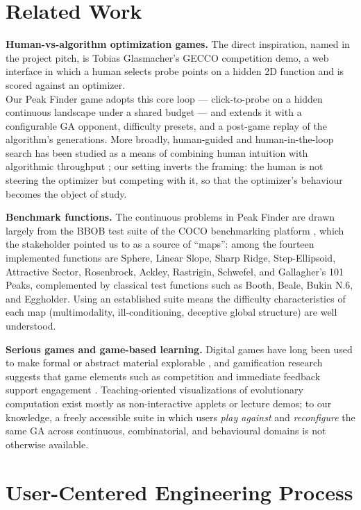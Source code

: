 \documentclass[conference]{IEEEtran}
\begin{document}
\section{Related Work}
\textbf{Human-vs-algorithm optimization games.} The direct inspiration, named in the project pitch, is Tobias Glasmacher's GECCO competition demo, a web interface in which a human selects probe points on a hidden 2D function and is scored against an optimizer. \\
Our Peak Finder game adopts this core loop --- click-to-probe on a hidden continuous landscape under a shared budget --- and extends it with a configurable GA opponent, difficulty presets, and a post-game replay of the algorithm's generations. More broadly, human-guided and human-in-the-loop search has been studied as a means of combining human intuition with algorithmic throughput \cite{anderson2000,takagi2001}; our setting inverts the framing: the human is not steering the optimizer but competing with it, so that the optimizer's behaviour becomes the object of study.

\textbf{Benchmark functions.} The continuous problems in Peak Finder are drawn largely from the BBOB test suite of the COCO benchmarking platform \cite{hansen2021coco}, which the stakeholder pointed us to as a source of ``maps'': among the fourteen implemented functions are Sphere, Linear Slope, Sharp Ridge, Step-Ellipsoid, Attractive Sector, Rosenbrock, Ackley, Rastrigin, Schwefel, and Gallagher's 101 Peaks, complemented by classical test functions such as Booth, Beale, Bukin N.6, and Eggholder. Using an established suite means the difficulty characteristics of each map (multimodality, ill-conditioning, deceptive global structure) are well understood.

\textbf{Serious games and game-based learning.} Digital games have long been used to make formal or abstract material explorable \cite{prensky2001,gee2003}, and gamification research suggests that game elements such as competition and immediate feedback support engagement \cite{deterding2011}. Teaching-oriented visualizations of evolutionary computation exist mostly as non-interactive applets or lecture demos; to our knowledge, a freely accessible suite in which users \emph{play against} and \emph{reconfigure} the same GA across continuous, combinatorial, and behavioural domains is not otherwise available.

\section{User-Centered Engineering Process}
\label{sec:uce}
\end{document}
